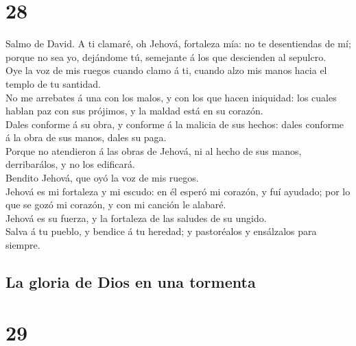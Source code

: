\hypertarget{section-27}{%
\section{28}\label{section-27}}

 Salmo de David. A ti clamaré, oh Jehová, fortaleza mía:
no te desentiendas de mí; porque no sea yo, dejándome tú, semejante á
los que descienden al sepulcro.\\
 Oye la voz de mis ruegos cuando clamo á ti, cuando alzo
mis manos hacia el templo de tu santidad.\\
 No me arrebates á una con los malos, y con los que hacen
iniquidad: los cuales hablan paz con sus prójimos, y la maldad está en
su corazón.\\
 Dales conforme á su obra, y conforme á la malicia de sus
hechos: dales conforme á la obra de sus manos, dales su paga.\\
 Porque no atendieron á las obras de Jehová, ni al hecho
de sus manos, derribarálos, y no los edificará.\\
 Bendito Jehová, que oyó la voz de mis ruegos.\\
 Jehová es mi fortaleza y mi escudo: en él esperó mi
corazón, y fuí ayudado; por lo que se gozó mi corazón, y con mi canción
le alabaré.\\
 Jehová es su fuerza, y la fortaleza de las saludes de su
ungido.\\
 Salva á tu pueblo, y bendice á tu heredad; y pastoréalos
y ensálzalos para siempre.

\hypertarget{la-gloria-de-dios-en-una-tormenta}{%
\subsection{La gloria de Dios en una
tormenta}\label{la-gloria-de-dios-en-una-tormenta}}

\hypertarget{section-28}{%
\section{29}\label{section-28}}

